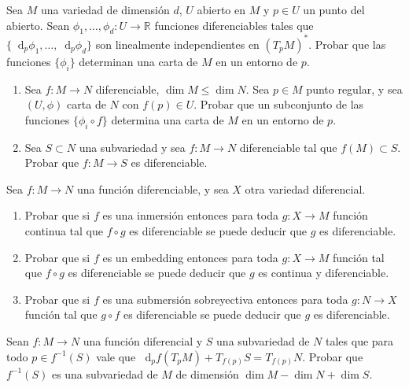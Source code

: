 \documentclass[12pt, a4paper]{amsart}
\theoremstyle{definition}
\newcommand{\RR}{\mathbb{R}}      %
\newcommand*\diff{\mathop{}\!\mathrm{d}}
\begin{document}
\begin{question}
Sea $M$ una variedad de dimensión $d$, $U$ abierto en $M$ y $p\in U$ un punto del abierto. Sean $\phi_1,\dots, \phi_d :U\to \RR $ funciones diferenciables
tales que $\{\diff_p\phi_1,\dots, \diff_p\phi_d\}$ son linealmente independientes en $(T_pM)^*$. Probar que las funciones $\{\phi_i\}$ determinan una
carta de $M$ en un entorno de $p$.
\end{question}

\begin{question}
\vspace{-1.5em}
\begin{enumerate}[label=\textbf{\alph*.}]
\item
Sea $f:M\to N$  diferenciable, $\dim M\leq\dim N$. Sea $p\in M$ punto regular, y sea $(U,\phi)$ carta de $N$ con $f(p)\in U$.
Probar que un subconjunto de las funciones $\{\phi_i \circ f\}$ determina una carta de $M$ en un entorno de $p$.
\item
Sea $S\subset N$ una subvariedad y sea $f:M\to N$ diferenciable tal que $f(M)\subset S$. Probar que $f:M\to S$ es diferenciable.
\end{enumerate}
\end{question}
\begin{question}
Sea $f:M\to N$ una función diferenciable, y sea $X$ otra variedad diferencial.

\begin{enumerate}[label=\textbf{\alph*.}]

\item Probar que si $f$ es una inmersión entonces para toda $g:X\to M$ función continua tal que $f\circ g$ es diferenciable se puede deducir que
$g$ es diferenciable.


\item Probar que si $f$ es un embedding entonces para toda $g:X\to M$ función tal que $f\circ g$ es diferenciable se puede deducir que $g$ es continua
y diferenciable.

\item Probar que si $f$ es una submersión sobreyectiva entonces para toda $g:N\to X$ función tal que $g\circ f$ es diferenciable se puede deducir
que $g$ es diferenciable.
\end{enumerate}
\end{question}

\begin{question}
Sean $f:M \to N$ una función diferencial y $S$ una subvariedad de $N$ tales que para todo
$p \in f^{-1}(S)$ vale que $\diff_pf(T_pM)+T_{f(p)}S=T_{f(p)}N$. Probar que $f^{-1}(S)$ es una subvariedad de $M$
de dimensión $\dim M -\dim N +\dim S$.
\end{question}
\end{document}
